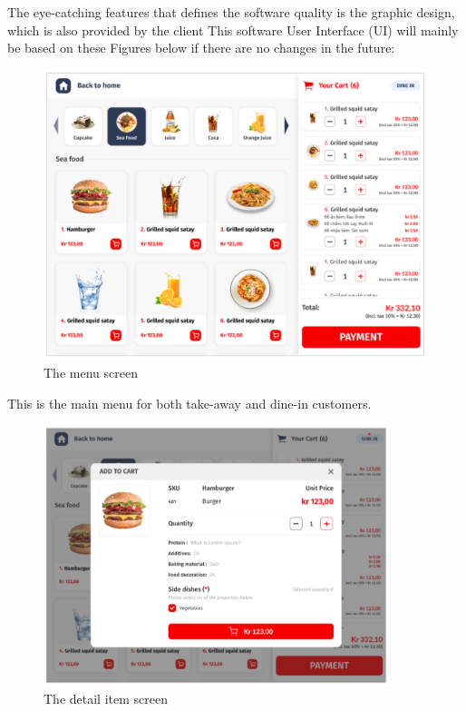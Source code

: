 \documentclass[a4paper]{article}
\numberwithin{equation}{section}
\begin{document}
The eye-catching features that defines the software quality is the graphic design, which is also provided by the client
This software User Interface (UI) will mainly be based on these Figures below if there are no changes in the future:

\begin{figure}[H]
  \centering
  \includegraphics[width=\textwidth]{./assets/t1/UI_menu.png}
  \caption{The menu screen}
\end{figure}

This is the main menu for both take-away and dine-in customers.

\begin{figure}[H]
  \centering
  \includegraphics[width=0.9\textwidth]{./assets/t1/UI_detail.png}
  \caption{The detail item screen}
\end{figure}
\end{document}
